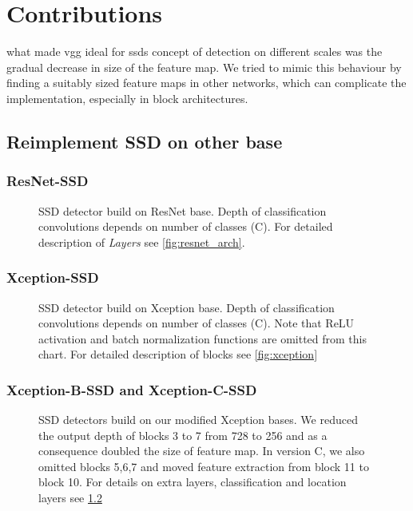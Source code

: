 \chapter{Contributions}

what made vgg ideal for ssds concept of detection on different scales was the gradual decrease in size of the feature map. We tried to mimic this behaviour by finding a suitably sized feature maps in other networks, which can complicate the implementation, especially in block architectures.


\section{Reimplement SSD on other base}
\subsection{ResNet-SSD}
\begin{figure}
    \resnetSSD
    \caption{SSD detector build on ResNet base. Depth of classification convolutions depends on number of classes (C). For detailed description of \textit{Layers} see \cref{fig:resnet_arch}.}
    \label{fig:resnetSSD}
\end{figure}

\subsection{Xception-SSD}


\begin{figure}
    \xceptionSSD
    \caption{SSD detector build on Xception base. Depth of classification convolutions depends on number of classes (C). Note that ReLU activation and batch normalization functions are omitted from this chart. For detailed description of blocks see \cref{fig:xception}}
    \label{fig:xceptionSSD}
\end{figure}


\subsection{Xception-B-SSD and Xception-C-SSD }

\begin{figure}
    \xceptionBSSD
    \caption{SSD detectors build on our modified Xception bases. We reduced the output depth of blocks 3 to 7 from 728 to 256 and as a consequence doubled the size of feature map. In version C, we also omitted blocks 5,6,7 and moved feature extraction from block 11 to block 10. For details on extra layers, classification and location layers see \cref{fig:xceptionSSD}}
    \label{fig:xceptionBSSD}
\end{figure}


